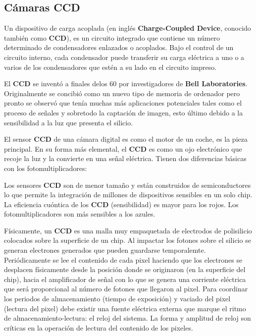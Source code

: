 \subsection{Cámaras CCD}

Un dispositivo de carga acoplada (en inglés \textbf{Charge-Coupled Device}, conocido también como \textbf{CCD}), es un circuito integrado que contiene un número determinado de condensadores enlazados o acoplados. Bajo el control de un circuito interno, cada condensador puede transferir su carga eléctrica a uno o a varios de los condensadores que estén a su lado en el circuito impreso.

\bigskip
El \textbf{CCD} se inventó a finales delos 60 por investigadores de \textbf{Bell Laboratories}. Originalmente se concibió como un nuevo tipo de memoria de ordenador pero pronto se observó que tenía muchas más aplicaciones potenciales tales como el proceso de señales y sobretodo la captación de imagen, esto último debido a la sensibilidad a la luz que presenta el silicio.

\bigskip
El sensor \textbf{CCD} de una cámara digital es como el motor de un coche, es la pieza principal. En su forma más elemental, el \textbf{CCD} es como un ojo electrónico que recoje la luz y la convierte en una señal eléctrica. Tienen dos diferencias básicas con los fotomultiplicadores:

\bigskip
Los sensores \textbf{CCD} son de menor tamaño y están construidos de semiconductores lo que permite la integración de millones de dispositivos sensibles en un solo chip.
La eficiencia cuóntica de los \textbf{CCD} (sensibilidad) es mayor para los rojos. Los fotomultiplicadores son más sensibles a los azules.

\bigskip
Físicamente, un \textbf{CCD} es una malla muy empaquetada de electrodos de polisilicio colocados sobre la superficie de un chip. Al impactar los fotones sobre el silicio se generan electrones generados que pueden guardarse temporalemte. Periódicamente se lee el contenido de cada pixel haciendo que los electrones se desplacen físicamente desde la posición donde se originaron (en la superficie del chip), hacia el amplificador de señal con lo que se genera una corriente eléctrica que será proporcional al número de fotones que llegaron al pixel. Para coordinar los periodos de almacenamiento (tiempo de exposición) y vaciado del pixel (lectura del pixel) debe existir una fuente eléctrica externa que marque el ritmo de almacenamiento-lectura: el reloj del sistema. La forma y amplitud de reloj son críticas en la operación de lectura del contenido de los pixeles.

